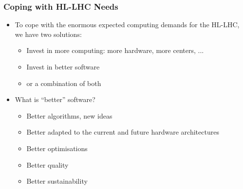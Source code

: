 \begin{frame}
\frametitle{Coping with HL-LHC Needs}

\begin{itemize}
\item To cope with the enormous expected computing demands for the HL-LHC, we have two solutions:
  \begin{itemize}
  \item Invest in more computing: more hardware, more centers, ...
  \item Invest in better software
  \item or a combination of both
  \end{itemize}
\item What is ``better'' software?
  \begin{itemize}
  \item Better algorithms, new ideas
  \item Better adapted to the current and future hardware architectures
  \item Better optimisations
  \item Better quality
  \item Better sustainability
  \end{itemize}
\end{itemize}

\end{frame}


